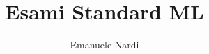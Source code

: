 \author{Emanuele Nardi}
\title{Esami Standard ML}

\newcommand{\authorName}{Emanuele Nardi}
\newcommand{\pdfTitle}{UNITN | Esami Standard ML}
\newcommand{\subject}{Functional programming}
\newcommand{\tags}{SML}
